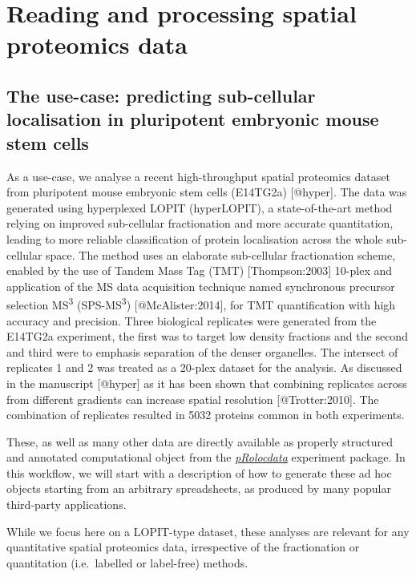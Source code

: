 \section{Reading and processing spatial proteomics
data}\label{reading-and-processing-spatial-proteomics-data}

\subsection{The use-case: predicting sub-cellular localisation in
pluripotent embryonic mouse stem
cells}\label{the-use-case-predicting-sub-cellular-localisation-in-pluripotent-embryonic-mouse-stem-cells}

As a use-case, we analyse a recent high-throughput spatial proteomics
dataset from pluripotent mouse embryonic stem cells (E14TG2a)
{[}@hyper{]}. The data was generated using hyperplexed LOPIT
(hyperLOPIT), a state-of-the-art method relying on improved sub-cellular
fractionation and more accurate quantitation, leading to more reliable
classification of protein localisation across the whole sub-cellular
space. The method uses an elaborate sub-cellular fractionation scheme,
enabled by the use of Tandem Mass Tag (TMT) {[}Thompson:2003{]} 10-plex
and application of the MS data acquisition technique named synchronous
precursor selection MS\textsuperscript{3} (SPS-MS\textsuperscript{3})
{[}@McAlister:2014{]}, for TMT quantification with high accuracy and
precision. Three biological replicates were generated from the E14TG2a
experiment, the first was to target low density fractions and the second
and third were to emphasis separation of the denser organelles. The
intersect of replicates 1 and 2 was treated as a 20-plex dataset for the
analysis. As discussed in the manuscript {[}@hyper{]} as it has been
shown that combining replicates across from different gradients can
increase spatial resolution {[}@Trotter:2010{]}. The combination of
replicates resulted in 5032 proteins common in both experiments.

These, as well as many other data are directly available as properly
structured and annotated computational object from the
\emph{\href{http://bioconductor.org/packages/pRolocdata}{pRolocdata}}
experiment package. In this workflow, we will start with a description
of how to generate these ad hoc objects starting from an arbitrary
spreadsheets, as produced by many popular third-party applications.

While we focus here on a LOPIT-type dataset, these analyses are relevant
for any quantitative spatial proteomics data, irrespective of the
fractionation or quantitation (i.e.~labelled or label-free) methods.

